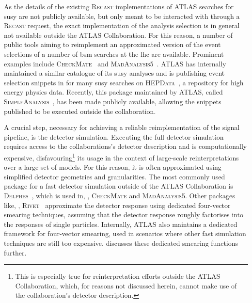As the details of the existing \textsc{Recast} implementations of ATLAS searches for \gls{susy} are not publicly available, but only meant to be interacted with through a \textsc{Recast} request, the exact implementation of the analysis selection is in general not available outside the ATLAS Collaboration. 
For this reason, a number of public tools aiming to reimplement an approximated version of the event selections of a number of \gls{bsm} searches at the \gls{lhc} are available.
Prominent examples include \textsc{CheckMate}~\cite{Checkmate2:2016npn,Checkmate:2013wra} and \textsc{MadAnalysis5}~\cite{MadAnalysis:2012fm}.
ATLAS has internally maintained a similar catalogue of its \gls{susy} analyses and is publishing event selection snippets in \Cpp for many \gls{susy} searches on \textsc{HEPData}~\cite{HEPData:2017ypu}, a repository for high energy physics data.
Recently, this package maintained by ATLAS, called \textsc{SimpleAnalysis}~\cite{simpleanalysis}, has been made publicly available, allowing the \Cpp snippets published to be executed outside the collaboration.

A crucial step, necessary for achieving a reliable reimplementation of the signal pipeline, is the detector simulation.
Executing the full detector simulation requires access to the collaborations's detector description and is computationally expensive, disfavouring\footnote{This is especially true for reinterpretation efforts outside the ATLAS Collaboration, which, for reasons not discussed herein, cannot make use of the collaboration's detector description.} its usage in the context of large-scale reinterpretations over a large set of models.
For this reason, it is often approximated using simplified detector geometries and granularities.
The most commonly used package for a fast detector simulation outside of the ATLAS Collaboration is \textsc{Delphes}~\cite{Delphes:2009tx}, which is used in, \eg, \textsc{CheckMate} and \textsc{MadAnalysis5}.
Other packages like, \eg, \textsc{Rivet}~\cite{Rivet1:2010ar,Rivet2:2019stt} approximate the detector response using dedicated four-vector smearing techniques, assuming that the detector response roughly factorises into the responses of single particles.
Internally, ATLAS also maintains a dedicated framework for four-vector smearing, used in scenarios where other fast simulation techniques are still too expensive.
 discusses these dedicated smearing functions further.

